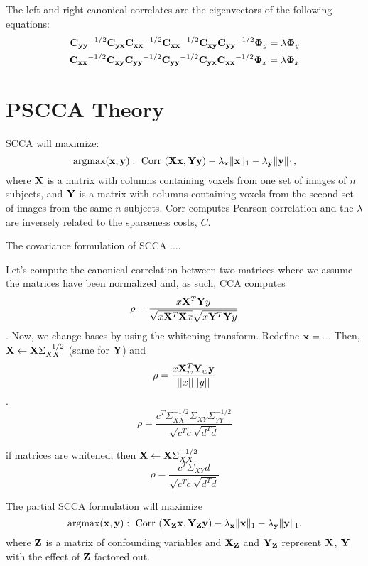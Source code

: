 \documentclass{llncs}
\newcommand{\X}{{\bf X}}
\newcommand{\x}{{\bf x}}
\newcommand{\Y}{{\bf Y}}
\newcommand{\y}{{\bf y}}
\newcommand{\Z}{{\bf Z}}
\begin{document}
The left and right canonical correlates are
the eigenvectors of the following equations:
\begin{eqnarray}
\label{eigvecs}
\nonumber
{\bf C_{yy}}^{-1/2}{\bf C_{yx}}{\bf C_{xx}}^{-1/2}{\bf C_{xx}}^{-1/2}{\bf C_{xy}}{\bf C_{yy}}^{-1/2}{\boldsymbol\Phi_y} = \lambda {\boldsymbol\Phi_y} \\
{\bf C_{xx}}^{-1/2}{\bf C_{xy}}{\bf C_{yy}}^{-1/2}{\bf C_{yy}}^{-1/2}{\bf C_{yx}}{\bf C_{xx}}^{-1/2}{\boldsymbol\Phi_x} = \lambda {\boldsymbol\Phi_x}
\end{eqnarray}





\section{PSCCA Theory}
SCCA will maximize:
\begin{equation}
\text{argmax}( \x,\y) :
~\text{Corr}~( \X \x , \Y \y) - \lambda_\x \| \x \|_1 - \lambda_\y \|  \y  \|_1 , 
\end{equation} 
where $\X$ is a matrix with columns containing voxels from one set of
images of $n$ subjects, 
and $\Y$ is a matrix with columns containing voxels from the second
set of images from the same $n$ subjects. 
Corr computes Pearson correlation and the
$\lambda$ are inversely related to the sparseness costs, $C$.  %

The covariance formulation of SCCA .... 

Let's compute the canonical correlation between two matrices where we
assume the matrices have been normalized and, as such, CCA computes
$$ \rho = \frac{ x \X^T \Y y  }{ \sqrt{x  \X^T \X x}\sqrt{x  \Y^T \Y y}  } $$.  Now, we change bases by
using the whitening transform.  
Redefine $\x =  ... $ Then, $\X \leftarrow \X \Sigma^{-1/2}_{XX}$ (same for $\Y$) and
$$ \rho = \frac{ x \X_w^T \Y_w \y  }{ ||x|| || y||} $$.
$$\rho = \frac{c^T \Sigma^{-1/2}_{XX} \Sigma_{XY}
  \Sigma^{-1/2}_{YY}}{\sqrt{c^Tc}\sqrt{d^Td}}$$

if matrices are whitened, then $\X \leftarrow \X \Sigma^{-1/2}_{XX}$
$$ \rho = \frac{c^T \Sigma_{XY}  d }{\sqrt{c^Tc}\sqrt{d^Td}}$$

The partial SCCA formulation will maximize 
\begin{equation}
\text{argmax}( \x,\y) :
~\text{Corr}~( \X_{\Z} \x , \Y_{\Z} \y) - \lambda_\x \| \x \|_1 - \lambda_\y \|  \y  \|_1 , 
\end{equation} 
where $\Z$ is a matrix of confounding variables and $\X_{\Z}$ and
$\Y_{\Z}$ represent $\X$, $\Y$ with the effect of $\Z$ factored out.
\end{document}
